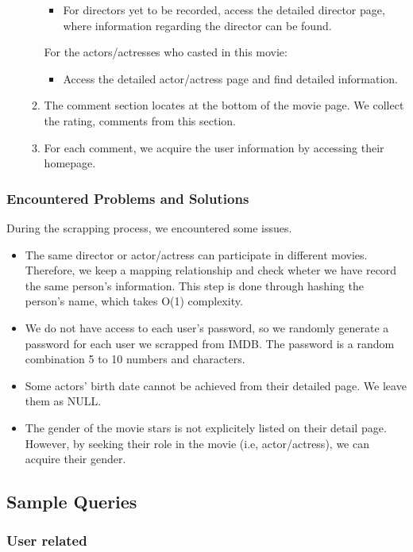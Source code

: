 \begin{CJK*}{UTF8}{gbsn}
\begin{enumerate}
\begin{enumerate}
        \begin{itemize}
            \item For directors yet to be recorded, access the detailed director page, where information regarding the director can be found.
        \end{itemize}
        For the actors/actresses who casted in this movie:
        \begin{itemize}
            \item Access the detailed actor/actress page and find detailed information.
        \end{itemize}
        \item The comment section locates at the bottom of the movie page. We collect the rating, comments from this section.
        \item For each comment, we acquire the user information by accessing their homepage.
    \end{enumerate}
\end{enumerate}
\subsubsection{Encountered Problems and Solutions}
During the scrapping process, we encountered some issues.
\begin{itemize}
    \item The same director or actor/actress can participate in different movies. Therefore, we keep a mapping relationship and check wheter we have record the same person's information. This step is done through hashing the person's name, which takes O(1) complexity.
    \item We do not have access to each user's password, so we randomly generate a password for each user we scrapped from IMDB. The password is a random combination 5 to 10 numbers and characters.
    \item Some actors' birth date cannot be achieved from their detailed page. We leave them as NULL.
    \item The gender of the movie stars is not explicitely listed on their detail page. However, by seeking their role in the movie (i.e, actor/actress), we can acquire their gender.
\end{itemize}
\subsection{Sample Queries}
\subsubsection{User related}

\end{CJK*}
